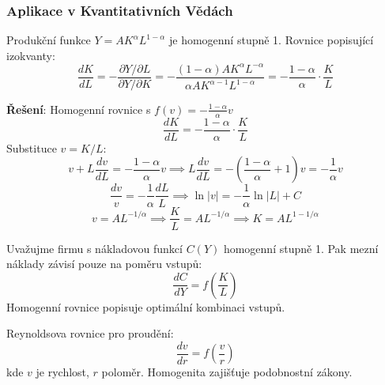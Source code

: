 \vspace{0.8\baselineskip}

\subsubsection{Aplikace v Kvantitativních Vědách}
\label{subsubsec:aplikace-kvantitativni}

\begin{application}
\label{app:cobb-douglas}
Produkční funkce $Y = AK^\alpha L^{1-\alpha}$ je homogenní stupně 1. Rovnice popisující izokvanty:
\[
\frac{dK}{dL} = -\frac{\partial Y/\partial L}{\partial Y/\partial K} = -\frac{(1-\alpha)AK^\alpha L^{-\alpha}}{\alpha AK^{\alpha-1}L^{1-\alpha}} = -\frac{1-\alpha}{\alpha}\cdot\frac{K}{L}
\]

\textbf{Řešení}: Homogenní rovnice s $f(v) = -\frac{1-\alpha}{\alpha}v$
\[
\frac{dK}{dL} = -\frac{1-\alpha}{\alpha}\cdot\frac{K}{L}
\]
Substituce $v = K/L$:
\[
v + L\frac{dv}{dL} = -\frac{1-\alpha}{\alpha}v \implies L\frac{dv}{dL} = -\left(\frac{1-\alpha}{\alpha} + 1\right)v = -\frac{1}{\alpha}v
\]
\[
\frac{dv}{v} = -\frac{1}{\alpha}\frac{dL}{L} \implies \ln|v| = -\frac{1}{\alpha}\ln|L| + C
\]
\[
v = AL^{-1/\alpha} \implies \frac{K}{L} = AL^{-1/\alpha} \implies K = AL^{1-1/\alpha}
\]
\end{application}

\vspace{0.6\baselineskip}

\begin{application}
\label{app:konstantni-vynosy}
Uvažujme firmu s nákladovou funkcí $C(Y)$ homogenní stupně 1. Pak mezní náklady závisí pouze na poměru vstupů:
\[
\frac{dC}{dY} = f\left(\frac{K}{L}\right)
\]
Homogenní rovnice popisuje optimální kombinaci vstupů.
\end{application}

\vspace{0.6\baselineskip}

\begin{application}
\label{app:podobnostni-zakony}
Reynoldsova rovnice pro proudění:
\[
\frac{dv}{dr} = f\left(\frac{v}{r}\right)
\]
kde $v$ je rychlost, $r$ poloměr. Homogenita zajišťuje podobnostní zákony.
\end{application}

\vspace{0.8\baselineskip}


